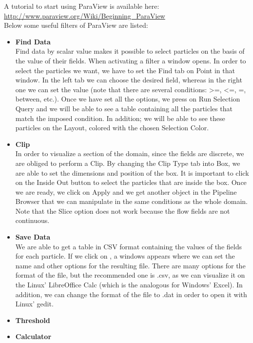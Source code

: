 \documentclass[12pt]{memoir}
\begin{document}
A tutorial to start using ParaView is available here:\\
\url{http://www.paraview.org/Wiki/Beginning_ParaView}\\

Below some useful filters of ParaView are listed:\\
\begin{itemize} 
\item \textbf{Find Data}\\
Find data by scalar value makes it possible to select particles 
on the basis of the value of their fields. When activating a filter
a window opens. In order to select the particles we want, 
we have to set the Find tab on Point in that window. 
In the left tab we can choose the desired field, whereas in the right one 
we can set the value (note that there are several conditions: >=, <=, =, between, etc.). 
Once we have set all the options, we press on Run Selection Query and we 
will be able to see a table containing all the particles that match 
the imposed condition. 
In addition; we will be able to see these particles on 
the Layout, colored with the chosen Selection Color.
\item \textbf{Clip} \\
In order to visualize a section of the domain, 
since the fields are discrete, we are obliged to perform a Clip. 
By changing the Clip Type tab into Box, we are able to set the dimensions 
and position of the box. It is important to click on the Inside Out button 
to select the particles that are inside the box. Once we are ready, we click on 
Apply and we get another object in the Pipeline Browser 
that we can manipulate in the same conditions as the whole domain. 
Note that the Slice option does not work because the flow fields are not continuous.
\item \textbf{Save Data} \\
We are able to get a table in CSV format containing the values of the 
fields for each particle. If we click on , a windows appears where 
we can set the name and other options for the resulting file. 
There are many options for the format of the file, but the recommended 
one is .csv, as we can visualize it on the Linux’ LibreOffice Calc 
(which is the analogous for Windows’ Excel). In addition, 
we can change the format of the file to .dat in order to open 
it with Linux’ gedit. 
\item \textbf{Threshold} \\
\item \textbf{Calculator} \\
\end{itemize}
\end{document}
